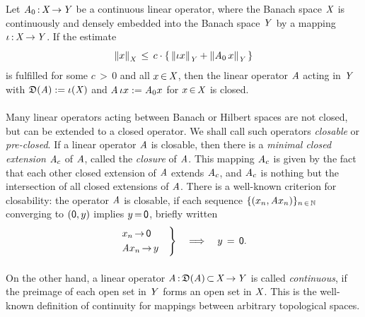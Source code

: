\documentclass[11pt,twoside]{article}
\begin{document}
\begin{theorem1}\label{BROWDER_THEOREM}
Let $\mathit{A}_0 {\,:\,} \mathit{X} {\,\to\,} \mathit{Y}$ be a continuous linear operator,
where the Banach space $\mathit{X}$ is continuously and densely embedded
into the Banach space $\mathit{Y}$ by a mapping $\iota {\,:\,} \mathit{X} {\,\to\,} \mathit{Y}$.
If the estimate
\[
\left\lVert x \right\rVert_{\mathit{X}} \, \leq \,
c \cdot
\{ \,\left\lVert \iota x \right\rVert_{\mathit{Y}} + \left\lVert \mathit{A}_0 \, x \right\rVert_{\mathit{Y}} \, \}
\]
is fulfilled for some $c {\,>\,} 0$ and all $x {\,\in\,} \mathit{X}$,
then the linear operator $\mathit{A}$ acting in $\mathit{Y}$ with
$\mathfrak{D}(\mathit{A}) := \iota(\mathit{X})$ and
$\mathit{A}\, \iota x := \mathit{A}_0 x$ for $x {\,\in\,} \mathit{X}$ is closed.
\end{theorem1}

\paragraph{} %
Many linear operators acting between Banach or Hilbert spaces are not closed,
but can be extended to a closed operator.
We shall call such operators \textit{closable} or \textit{pre-closed}.
If a linear operator $\mathit{A}$ is closable,
then there is a \textit{minimal closed extension} $\mathit{A}_c$ of $\mathit{A}$,
called the \textit{closure} of $\mathit{A}$.
This mapping $\mathit{A}_c$ is given by the fact
that each other closed extension of $\mathit{A}$ extends $\mathit{A}_c$,
and $\mathit{A}_c$ is nothing but the intersection
of all closed extensions of $\mathit{A}$.
There is a well-known criterion for closability:
the  operator $\mathit{A}$ is closable,
if each sequence $\{(x_n,\mathit{A} x_n)\}_{n {\,\in\,} {\mathbb{N}}}$ converging to $({\mathsf{0}},y)$
implies $y {\,=\,} {\mathsf{0}}$,
briefly written
\[
\begin{rcases}
 x_n       {\,\to\,} {\mathsf{0}} \quad \\
 \mathit{A} x_n {\,\to\,}  y \quad \\
\end{rcases}
\quad \Longrightarrow \quad
y \,=\, {\mathsf{0}}.
\]

\paragraph{} %
On the other hand,
a linear operator $\mathit{A} {\,:\,} \mathfrak{D}(\mathit{A}) {\,\subset\,} \mathit{X} {\,\to\,} \mathit{Y}$
is called \textit{continuous},
if the preimage of each open set in $\mathit{Y}$ forms an open set in $\mathit{X}$.
This is the well-known definition of continuity for mappings
between arbitrary topological spaces.
\end{document}
